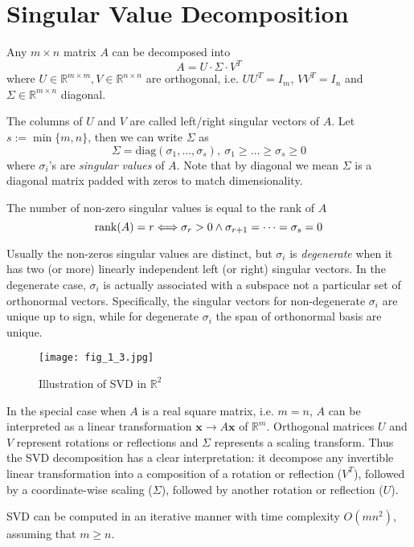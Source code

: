 \documentclass[../book-template.tex]{subfiles}
\begin{document}
\section{Singular Value Decomposition}
Any $m\times n$ matrix $A$ can be decomposed into
\begin{equation*}
    A=U\cdot \Sigma \cdot V^T
\end{equation*}
where $U\in \mathbb{R}^{m\times m},V\in \mathbb{R}^{n\times n}$ are orthogonal, i.e. $UU^T=I_m$, $VV^T=I_n$ and $\Sigma\in \mathbb{R}^{m\times n}$ diagonal. 
\par The columns of $U$ and $V$ are called left/right singular vectors of $A$. Let $s:=\min\{m,n\}$, then we can write $\Sigma$ as $$\Sigma = \text{diag}(\sigma_1,\dots,\sigma_s),\ \sigma_1\geq\dots\geq\sigma_s\geq0$$
where $\sigma_i$'s are \emph{singular values} of $A$. Note that by diagonal we mean $\Sigma$ is a diagonal matrix padded with zeros to match dimensionality. 
\par The number of non-zero singular values is equal to the rank of $A$
\begin{equation*}
    \operatorname{rank}(A)=r\Longleftrightarrow\sigma_r>0\wedge \sigma_{r+1}=\dots=\sigma_{s}=0
\end{equation*}
\par Usually the non-zeros singular values are distinct, but $\sigma_i$ is \emph{degenerate} when it has two (or more) linearly independent left (or right) singular vectors. In the degenerate case, $\sigma_i$ is actually associated with a subspace not a particular set of orthonormal vectors. Specifically, the singular vectors for non-degenerate $\sigma_i$ are unique up to sign, while for degenerate $\sigma_i$ the span of orthonormal basis are unique.
\begin{figure}[h] 
    \centering 
    \texttt{[image: fig\_1\_3.jpg]} 
    \caption{Illustration of SVD in $\mathbb{R}^2$}\label{fig_1_3}
\end{figure}
\par In the special case when $A$ is a real square matrix, i.e. $m=n$, $A$ can be interpreted as a linear transformation $\bm{x}\rightarrow A\bm{x}$ of $\mathbb{R}^m$. Orthogonal matrices $U$ and $V$ represent rotations or reflections and $\Sigma$ represents a scaling transform. Thus the SVD decomposition has a clear interpretation: it decompose any invertible linear transformation into a composition of a rotation or reflection ($V^T$), followed by a coordinate-wise scaling ($\Sigma$), followed by another rotation or reflection ($U$).
\begin{remark}
SVD can be computed in an iterative manner with time complexity $O(mn^2)$, assuming that $m\geq n$.
\end{remark}
\end{document}
